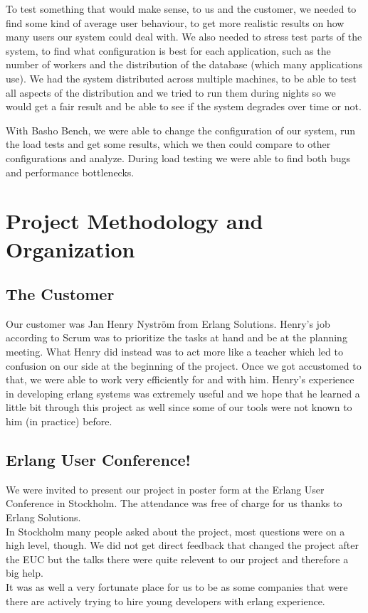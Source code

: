 \documentclass[11pt,a4paper]{report}
\begin{document}
To test something that would make sense, to us and the customer, we needed to
find some kind of average user behaviour, to get more realistic results on how
many users our system could deal with. We also needed to stress test parts of
the system, to find what configuration is best for each application, such as the
number of workers and the distribution of the database (which many applications
use). We had the system distributed across multiple machines, to be able to
test all aspects of the distribution and we tried to run them during nights so
we would get a fair result and be able to see if the system degrades over time
or not.

With Basho Bench, we were able to change the configuration of our system, run
the load tests and get some results, which we then could compare to other
configurations and analyze. During load testing we were able to find both bugs
and performance bottlenecks.

\chapter{Project Methodology and Organization}

\section{The Customer}
Our customer was Jan Henry Nyström from Erlang Solutions. Henry's job according to
Scrum was to prioritize the tasks at hand and be at the planning meeting.
What Henry did instead was to act more like a teacher which led to confusion on
our side at the beginning of the project. Once we got accustomed to that,
we were able to work very efficiently for and with him.
Henry's experience in developing erlang systems was extremely useful and we hope
that he learned a little bit through this project as well since some of our
tools were not known to him (in practice) before.
\section{Erlang User Conference!}
We were invited to present our project in poster form at the
Erlang User Conference in Stockholm. The attendance was free of charge for us
thanks to Erlang Solutions. \\
In Stockholm many people asked about the project, most questions were on a high
level, though. We did not get direct feedback that changed the project after the
EUC but the talks there were quite relevent to our project and therefore a big
help. \\
It was as well a very fortunate place for us to be as some companies that were
there are actively trying to hire young developers with erlang experience.
\end{document}
